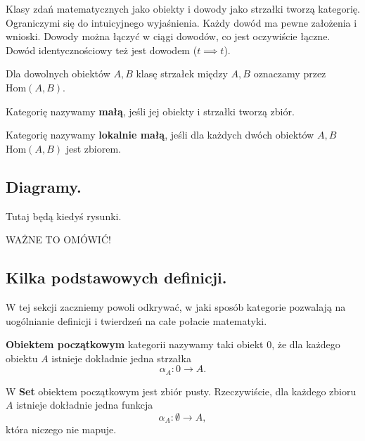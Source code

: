 \begin{example}
	Klasy zdań matematycznych jako obiekty i dowody jako strzałki tworzą kategorię.
	Ograniczymi się do intuicyjnego wyjaśnienia.
	Każdy dowód ma pewne założenia i wnioski.
	Dowody można łączyć w ciągi dowodów,
	co jest oczywiście łączne.
	Dowód identycznościowy też jest dowodem ($t \implies t$).
\end{example}

Dla dowolnych obiektów $A, B$ klasę strzałek między $A, B$ oznaczamy przez $\text{Hom}(A, B)$.

\begin{definition}
	Kategorię nazywamy \textbf{małą},
		jeśli jej obiekty i strzałki tworzą zbiór.
\end{definition}

\begin{definition}
	Kategorię nazywamy \textbf{lokalnie małą},
		jeśli dla każdych dwóch obiektów $A, B$  $\text{Hom}(A, B)$ jest zbiorem.
\end{definition}

\subsection{Diagramy.}

Tutaj będą kiedyś rysunki.

WAŻNE TO OMÓWIĆ!

\subsection{Kilka podstawowych definicji.}

W tej sekcji zaczniemy powoli odkrywać,
w jaki sposób kategorie pozwalają na uogólnianie definicji
i twierdzeń na całe połacie matematyki.

\begin{definition}
	\textbf{Obiektem początkowym} kategorii nazywamy taki obiekt $0$,
	że dla każdego obiektu $A$ istnieje dokładnie jedna strzałka
	\begin{equation}
		\alpha_A: 0 \to A.
	\end{equation}
\end{definition}

\begin{example}
	W \textbf{Set} obiektem początkowym jest zbiór pusty.
	Rzeczywiście, dla każdego zbioru $A$ istnieje dokładnie jedna funkcja
	\begin{equation}
		\alpha_A: \emptyset \to A,
	\end{equation}
	która niczego nie mapuje.
\end{example}

